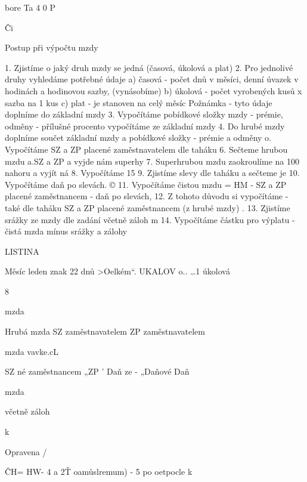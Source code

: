 bore Ta 4 0 P

Či


\newpage


Postup při výpočtu mzdy

1. Zjistíme o jaký druh mzdy se jedná (časová, úkolová a plat)
2. Pro jednolivé druhy vyhledáme potřebné údaje
a) časová - počet dnů v měsíci, denní úvazek v hodinách a hodinovou sazby,
(vynásobíme)
b) úkolová - počet vyrobených kusů x sazba na 1 kus
c) plat - je stanoven na celý měsíc
Požnámka - tyto údaje doplníme do základní mzdy
3. Vypočítáme pobídkové složky mzdy - prémie, odměny - přílušné procento
vypočítáme ze základní mzdy
4. Do hrubé mzdy doplníme součet základní mzdy a pobídkové složky - prémie
a odměny
o. Vypočítáme SZ a ZP placené zaměstnavatelem dle taháku
6. Sečteme hrubou mzdu a.SZ a ZP a vyjde nám superhy
7. Superhrubou mzdu zaokroulíme na 100 nahoru a vyjít ná
8. Vypočítáme 15 %
9. Zjistíme slevy dle taháku a sečteme je
10. Vypočítáme daň po slevách. ©
11. Vypočítáme čistou mzdu = HM - SZ a ZP placené zaměstnancem - daň po
slevách,
12. Z tohoto důvodu si vypočítáme - také dle taháku SZ a ZP placené
zaměstnancem (z hrubé mzdy) .
13. Zjistíme srážky ze mzdy dle zadání včetně záloh m
14. Vypočítáme částku pro výplatu - čistá mzda mínus srážky a zálohy






\newpage
LISTINA



Měsíc leden znak
22 dnů >Oelkém“.
UKALOV
o.. \ldots 1
úkolová

8



mzda

Hrubá mzda
SZ zaměstnavatelem
ZP zaměstnavatelem

mzda
vavke.cL

SZ né zaměstnancem
„ZP '
Daň ze -
„Daňové
Daň

mzda

včetně záloh

k



















Opravena /

ČH= HW- 4 a 2Ť oamůslremum) - 5 po oetpocle k


